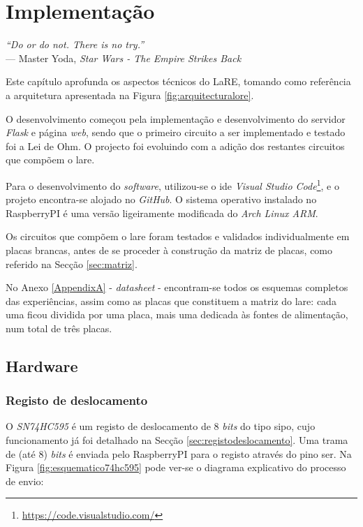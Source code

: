 \chapter{Implementação}
\label{Capítulo4}

\begin{flushright}
\textit{``Do or do not. There is no try.''} \\[0.5em]
--- Master Yoda, \textit{Star Wars - The Empire Strikes Back}
\end{flushright}


Este capítulo aprofunda os aspectos técnicos do LaRE, tomando como referência a arquitetura apresentada na Figura \ref{fig:arquitecturalore}.

O desenvolvimento começou pela implementação e desenvolvimento do servidor \textit{Flask} e página \textit{web}, sendo que o primeiro circuito a ser implementado e testado foi a Lei de Ohm. O projecto foi evoluindo com a adição dos restantes circuitos que compõem o \acrshort{lare}.

Para o desenvolvimento do \textit{software}, utilizou-se o \acrshort{ide} \textit{Visual Studio Code}\footnote{\url{https://code.visualstudio.com/}}, e o projeto encontra-se alojado no \textit{GitHub}. O sistema operativo instalado no \gls{RaspberryPI} é uma versão ligeiramente modificada do \textit{Arch Linux ARM}.

Os circuitos que compõem o \acrshort{lare} foram testados e validados individualmente em placas brancas, antes de se proceder à construção da matriz de placas, como referido na Secção \ref{sec:matriz}.

No Anexo \ref{AppendixA} - \textit{datasheet} - encontram-se todos os esquemas completos das experiências, assim como as placas que constituem a matriz do \acrshort{lare}: cada uma ficou dividida por uma placa, mais uma dedicada às fontes de alimentação, num total de três placas. 

\section{Hardware}
\subsection{Registo de deslocamento}
\label{sec:hwregistodeslocamento}
O \textit{SN74HC595} é um registo de deslocamento de 8 \textit{bits} do tipo \acrshort{sipo}, cujo funcionamento já foi detalhado na Secção \ref{sec:registodeslocamento}. Uma trama de (até 8) \textit{bits} é enviada pelo \gls{RaspberryPI} para o registo através do pino \acrshort{ser}. Na Figura \ref{fig:esquematico74hc595} pode ver-se o diagrama explicativo do processo de envio:

